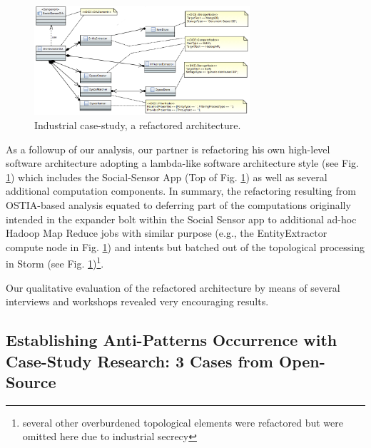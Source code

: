 \documentclass[smallextended]{svjour3}       %
\newcommand{\todoMB}[2]{\linespread{0.7}\todo[color=yellow!50,#1]{\scriptsize\textbf{MB:}#2}}
\begin{document}
\begin{figure}
\begin{center}
\includegraphics[width=8cm,draft]{fig8}
		\caption{Industrial case-study, a refactored architecture.}
		\label{atc}
		\end{center}
\end{figure}

As a followup of our analysis, our partner is refactoring his own high-level software architecture adopting a lambda-like software architecture style \cite{lambda} (see Fig. \ref{atc}) which includes the Social-Sensor App (Top of Fig. \ref{atc}) as well as several additional computation components. In summary, the refactoring resulting from OSTIA-based analysis equated to deferring part of the computations originally intended in the expander bolt within the Social Sensor app to additional ad-hoc Hadoop Map Reduce jobs with similar purpose (e.g., the EntityExtractor compute node in Fig. \ref{atc}) and intents but batched out of the topological processing in Storm (see Fig. \ref{atc})\footnote{several other overburdened topological elements were refactored but were omitted here due to industrial secrecy}. 

Our qualitative evaluation of the refactored architecture by means of several interviews and workshops revealed very encouraging results. 

\subsection{Establishing Anti-Patterns Occurrence with Case-Study Research: 3 Cases from Open-Source}\label{os}
\end{document}
